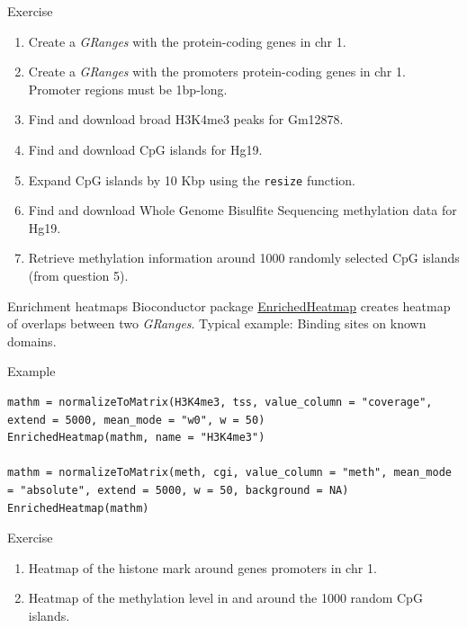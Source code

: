 \documentclass[10pt]{beamer}
\begin{document}
\begin{frame}[fragile]{Exercise}
  \begin{enumerate}
  \item Create a {\it GRanges} with the protein-coding genes in chr 1.
  \item Create a {\it GRanges} with the promoters protein-coding genes in chr 1. Promoter regions must be 1bp-long.
    \bigskip
  \item Find and download broad H3K4me3 peaks for Gm12878.
    \bigskip
  \item Find and download CpG islands for Hg19.
  \item Expand CpG islands by 10 Kbp using the \verb!resize! function.
    \bigskip
  \item Find and download Whole Genome Bisulfite Sequencing methylation data for Hg19.
  \item Retrieve methylation information around 1000 randomly selected CpG islands (from question 5).
  \end{enumerate}
\end{frame}

\begin{frame}[fragile]{Enrichment heatmaps}
  Bioconductor package \href{http://bioconductor.org/packages/release/bioc/vignettes/EnrichedHeatmap/inst/doc/EnrichedHeatmap.html}{EnrichedHeatmap} creates heatmap of overlaps between two {\it GRanges}. Typical example: Binding sites on known domains.

  \begin{exampleblock}{Example}
\begin{lstlisting}
mathm = normalizeToMatrix(H3K4me3, tss, value_column = "coverage", extend = 5000, mean_mode = "w0", w = 50)
EnrichedHeatmap(mathm, name = "H3K4me3")

mathm = normalizeToMatrix(meth, cgi, value_column = "meth", mean_mode = "absolute", extend = 5000, w = 50, background = NA)
EnrichedHeatmap(mathm)
\end{lstlisting}
  \end{exampleblock}  
  \begin{alertblock}{Exercise}
    \begin{enumerate}
    \item Heatmap of the histone mark around genes promoters in chr 1.
    \item Heatmap of the methylation level in and around the 1000 random CpG islands.
    \end{enumerate}
  \end{alertblock}
\end{frame}
\end{document}
